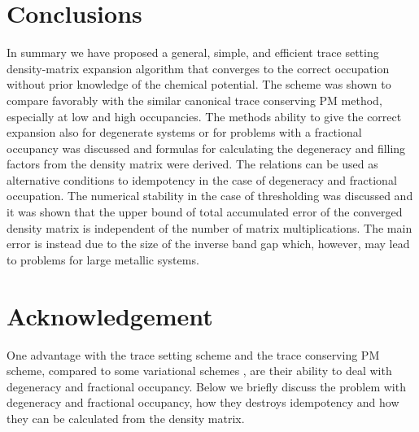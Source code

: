 \commentoutA{\documentclass[prb,aps,twocolumn,twocolumngrid,secnumarabic,superbib,hyperref]{revtex4}}
\begin{document}
\section{Conclusions}







In summary we have proposed a general, simple, and efficient 
trace setting density-matrix expansion algorithm that converges 
to the correct occupation without prior knowledge of the chemical
potential. The scheme was shown to compare favorably with the
similar canonical trace conserving PM method, especially at
low and high occupancies. The methods ability to give the
correct expansion also for degenerate systems or for problems
with a fractional occupancy was discussed
and formulas for calculating the degeneracy and filling factors
from the density matrix were derived. The relations can
be used as alternative conditions to idempotency in the
case of degeneracy and fractional occupation.
The numerical stability in the case of thresholding
was discussed and it was shown that the upper bound of 
total accumulated error of the converged density matrix is independent
of the number of matrix multiplications. The main error 
is instead due to the size of the inverse band gap which, however,
may lead to problems for large metallic systems.

\section{Acknowledgement}

\label{Degen}

One advantage with the trace setting scheme and the trace
conserving PM scheme, compared to some variational schemes \cite{Li93},
are their ability to deal with degeneracy and fractional occupancy.
Below we briefly discuss the problem with degeneracy and fractional
occupancy, how they destroys idempotency and how they can be calculated
from the density matrix.
\end{document}

